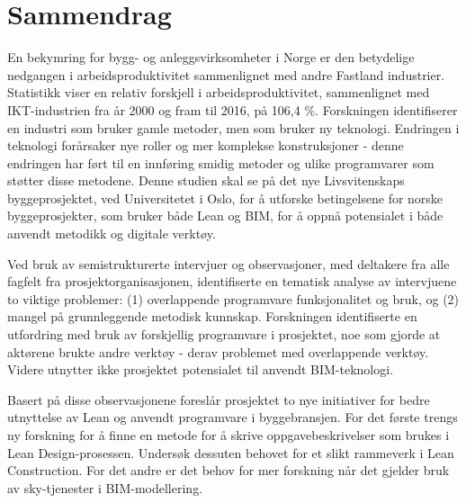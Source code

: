 \clearpage
{} 				
\setcounter{page}{1}

\pagestyle{fancy}
\fancyhf{}
\renewcommand{\chaptermark}[1]{\markboth{\chaptername\ \thechapter.\ #1}{}}
\renewcommand{\sectionmark}[1]{\markright{\thesection\ #1}}
\renewcommand{\headrulewidth}{0.1ex}
\renewcommand{\footrulewidth}{0.1ex}
\fancyfoot[LE,RO]{\thepage}
\fancypagestyle{plain}{\fancyhf{}\fancyfoot[LE,RO]{\thepage}\renewcommand{\headrulewidth}{0ex}}

\section*{\Large Sammendrag}

\noindent En bekymring for bygg- og anleggsvirksomheter i Norge er den betydelige nedgangen i arbeidsproduktivitet sammenlignet med andre Fastland industrier. Statistikk viser en relativ forskjell i arbeidsproduktivitet, sammenlignet med IKT-industrien fra år 2000 og fram til 2016, på 106,4 \%. Forskningen identifiserer en industri som bruker gamle metoder, men som bruker ny teknologi. Endringen i teknologi forårsaker nye roller og mer komplekse konstruksjoner - denne endringen har ført til en innføring smidig metoder og ulike programvarer som støtter disse metodene. Denne studien skal se på det nye Livsvitenskaps byggeprosjektet, ved Universitetet i Oslo, for å utforske betingelsene for norske byggeprosjekter, som bruker både Lean og BIM, for å oppnå potensialet i både anvendt metodikk og digitale verktøy.

Ved bruk av semistrukturerte intervjuer og observasjoner, med deltakere fra alle fagfelt fra prosjektorganisasjonen, identifiserte en tematisk analyse av intervjuene to viktige problemer: (1) overlappende programvare funksjonalitet og bruk, og (2) mangel på grunnleggende metodisk kunnskap. Forskningen identifiserte en utfordring med bruk av forskjellig programvare i prosjektet, noe som gjorde at aktørene brukte andre verktøy - derav problemet med overlappende verktøy. Videre utnytter ikke prosjektet potensialet til anvendt BIM-teknologi.

Basert på disse observasjonene foreslår prosjektet to nye initiativer for bedre utnyttelse av Lean og anvendt programvare i byggebransjen. For det første trengs ny forskning for å finne en metode for å skrive oppgavebeskrivelser som brukes i Lean Design-prosessen. Undersøk dessuten behovet for et slikt rammeverk i Lean Construction. For det andre er det behov for mer forskning når det gjelder bruk av sky-tjenester i BIM-modellering.
\clearpage